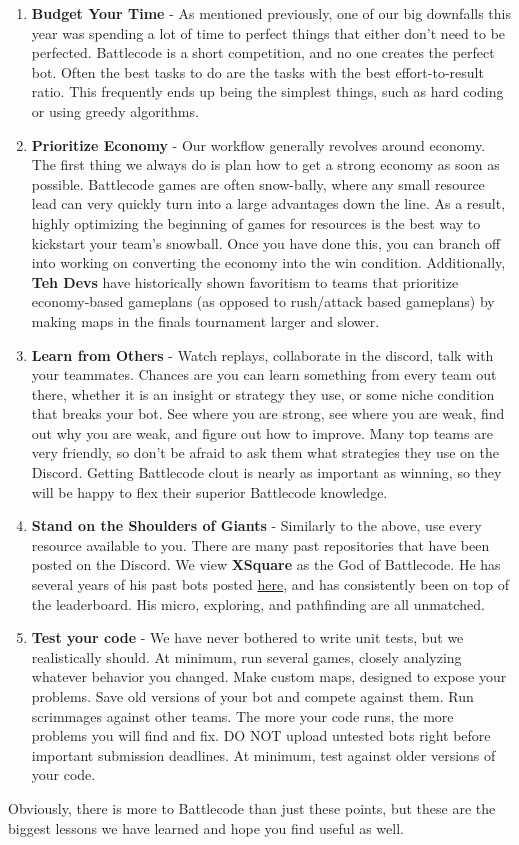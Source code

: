 \begin{enumerate}
\begin{itemize}
    
  \end{itemize}
  \item \textbf{Budget Your Time} - As mentioned previously, one of our big downfalls this year was spending a lot of time to perfect things that either don't need to be perfected. Battlecode is a short competition, and no one creates the perfect bot. Often the best tasks to do are the tasks with the best effort-to-result ratio. This frequently ends up being the simplest things, such as hard coding or using greedy algorithms.
  \item \textbf{Prioritize Economy} - Our workflow generally revolves around economy. The first thing we always do is plan how to get a strong economy as soon as possible. Battlecode games are often snow-bally, where any small resource lead can very quickly turn into a large advantages down the line. As a result, highly optimizing the beginning of games for resources is the best way to kickstart your team's snowball. Once you have done this, you can branch off into working on converting the economy into the win condition. Additionally, \textbf{Teh Devs} have historically shown favoritism to teams that prioritize economy-based gameplans (as opposed to rush/attack based gameplans) by making maps in the finals tournament larger and slower.
  \item \textbf{Learn from Others} - Watch replays, collaborate in the discord, talk with your teammates. Chances are you can learn something from every team out there, whether it is an insight or strategy they use, or some niche condition that breaks your bot. See where you are strong, see where you are weak, find out why you are weak, and figure out how to improve. Many top teams are very friendly, so don't be afraid to ask them what strategies they use on the Discord. Getting Battlecode clout is nearly as important as winning, so they will be happy to flex their superior Battlecode knowledge.
  \item \textbf{Stand on the Shoulders of Giants} - Similarly to the above, use every resource available to you. There are many past repositories that have been posted on the Discord. We view \textbf{XSquare} as the God of Battlecode. He has several years of his past bots posted \href{https://github.com/IvanGeffner}{here}, and has consistently been on top of the leaderboard. His micro, exploring, and pathfinding are all unmatched.
  \item \textbf{Test your code} - We have never bothered to write unit tests, but we realistically should. At minimum, run several games, closely analyzing whatever behavior you changed. Make custom maps, designed to expose your problems. Save old versions of your bot and compete against them. Run scrimmages against other teams. The more your code runs, the more problems you will find and fix. DO NOT upload untested bots right before important submission deadlines. At minimum, test against older versions of your code.
\end{enumerate}

Obviously, there is more to Battlecode than just these points, but these are the biggest lessons we have learned and hope you find useful as well.
